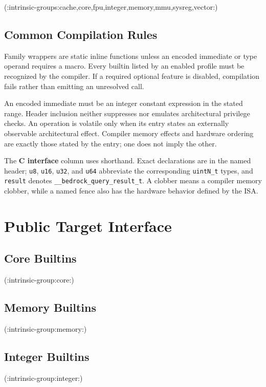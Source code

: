 \documentclass[10pt,twoside]{article}
\begin{document}
(:intrinsic-groups:cache,core,fpu,integer,memory,mmu,sysreg,vector:)

\subsection{Common Compilation Rules}
Family wrappers are static inline functions unless an encoded immediate or
type operand requires a macro. Every builtin listed by an enabled profile must
be recognized by the compiler. If a required optional feature is disabled,
compilation fails rather than emitting an unresolved call.

An encoded immediate must be an integer constant expression in the stated
range. Header inclusion neither suppresses nor emulates architectural
privilege checks. An operation is volatile only when its entry states an
externally observable architectural effect. Compiler memory effects and
hardware ordering are exactly those stated by the entry; one does not imply
the other.

The \textbf{C interface} column uses
\texttt{} shorthand. Exact declarations are in the
named header; \texttt{u8}, \texttt{u16}, \texttt{u32}, and \texttt{u64}
abbreviate the corresponding \texttt{uintN\_t} types, and \texttt{result}
denotes \texttt{\_\_bedrock\_query\_result\_t}. A clobber means a compiler
memory clobber, while a named fence also has the hardware behavior defined by
the ISA.

\section{Public Target Interface}\label{page:public-target-interface}

\subsection{Core Builtins}
(:intrinsic-group:core:)

\subsection{Memory Builtins}
(:intrinsic-group:memory:)

\subsection{Integer Builtins}
(:intrinsic-group:integer:)
\end{document}

